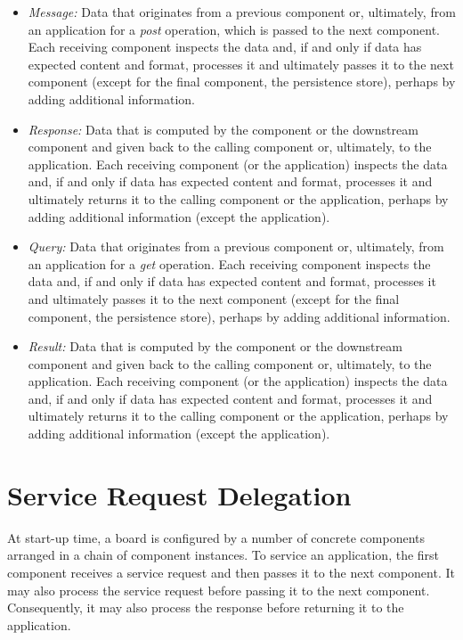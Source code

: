 \documentclass[oneside]{scrreprt}
\begin{document}
\begin{itemize}
	\item \emph{Message:} Data that originates from a previous
		component or, ultimately, from an application
		for a \emph{post} operation, which is passed
		to the next component. Each receiving component
		inspects the data
		and, if and only if data has expected content and
		format,
		processes it and ultimately passes it to the
		next component (except for the final component,
		the persistence store), perhaps by
		adding additional information.
	\item \emph{Response:} Data that is computed
		by the component or the downstream component
		and given back to the calling component or, ultimately,
		to the application. Each receiving component
		(or the application)
		inspects the data and,
		if and only if data has expected content and
		format, processes it and ultimately returns
		it to the calling component or the application,
		perhaps by adding additional
		information (except the application).
	\item \emph{Query:} Data that originates from a previous
		component or, ultimately, from an application
		for a \emph{get} operation. Each receiving component
		inspects the data
		and, if and only if data has expected content and
		format, processes it and ultimately passes it to the
		next component (except for the final component,
		the persistence store), perhaps by adding
		additional information.
	\item \emph{Result:} Data that is computed
		by the component or the downstream component
		and given back to the calling component or, ultimately,
		to the application. Each receiving component
		(or the application)
		inspects the data and,
		if and only if data has expected content and
		format, processes it and ultimately returns
		it to the calling component or the application,
		perhaps by adding additional
		information (except the application).
\end{itemize}


\section{Service Request Delegation}

At start-up time, a board is configured by a number
of concrete components arranged in a chain of component
instances. To service an application, the first
component receives a service request and then passes
it to the next component. It may also process the
service request before passing it to the next
component. Consequently, it may also process the
response before returning it to the application.
\end{document}
